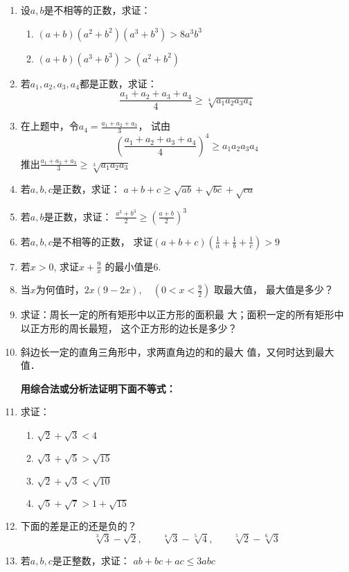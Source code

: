\begin{enumerate}
\item 设$a,b$是不相等的正数，求证：
\begin{enumerate}
    \item $(a+b)(a^2+b^2)(a^3+b^3)>8a^3b^3$
    \item $(a+b)(a^3+b^3)>(a^2+b^2)$
\end{enumerate}

\item 若$a_1,a_2,a_3,a_4$都是正数，求证：
\[\frac{a_1+a_2+a_3+a_4}{4}\ge \sqrt[4]{a_1a_2a_3a_4}\]
\item 在上题中，令$a_4=\frac{a_1+a_2+a_3}{3}$，
试由\[\left(\frac{a_1+a_2+a_3+a_4}{4}\right)^4\ge a_1a_2a_3a_4\]
推出$\frac{a_1+a_2+a_3}{3}\ge \sqrt[3]{a_1a_2a_3}$

\item 若$a,b,c$是正数，求证：
$a+b+c\ge \sqrt{ab}+\sqrt{bc}+\sqrt{ca}$
\item 若$a,b$是正数，求证：
$\frac{a^3+b^3}{2}\ge \left(\frac{a+b}{2}\right)^3$
\item 若$a,b,c$是不相等的正数，
求证$(a+b+c)\left(\frac{1}{a}+\frac{1}{b}+\frac{1}{c}\right)>9$

\item 若$x>0$, 求证$x+\frac{9}{x}$
的最小值是6.
\item 当$x$为何值时，$2x(9-2x),\quad \left(0<x<\frac{9}{2}\right)$
取最大值，
最大值是多少？
\item 求证：周长一定的所有矩形中以正方形的面积最
大；面积一定的所有矩形中以正方形的周长最短，
这个正方形的边长是多少？
\item  斜边长一定的直角三角形中，求两直角边的和的最大
值，又何时达到最大值．


\textbf{用综合法或分析法证明下面不等式：}

\item 求证：
\begin{multicols}{2}
\begin{enumerate}
    \item $\sqrt{2}+\sqrt{3}<4$
    \item $\sqrt{3}+\sqrt{5}>\sqrt{15}$
    \item $\sqrt{2}+\sqrt{3}<\sqrt{10}$
    \item $\sqrt{5}+\sqrt{7}>1+\sqrt{15}$
\end{enumerate}    
\end{multicols}

\item 下面的差是正的还是负的？
\[\sqrt[3]{3}-\sqrt{2},\qquad \sqrt[4]{3}-\sqrt[5]{4},\qquad \sqrt[5]{2}-\sqrt[6]{3} \]
\item 若$a,b,c$是正整数，求证：
$ab+bc+ac\le 3abc$


\end{enumerate}
